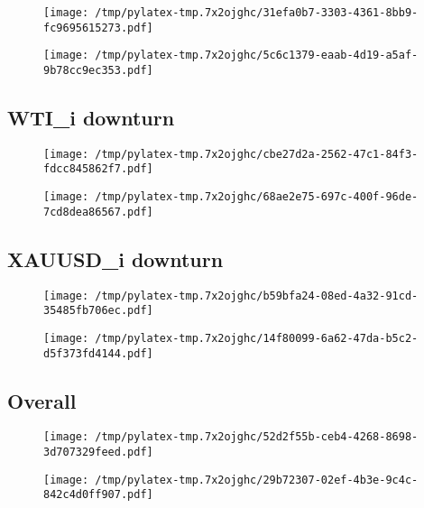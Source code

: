 \documentclass{article}%
\begin{document}
\begin{figure}[htbp]%
\centering%
\texttt{[image: /tmp/pylatex-tmp.7x2ojghc/31efa0b7-3303-4361-8bb9-fc9695615273.pdf]}%
\end{figure}

%


\begin{figure}[htbp]%
\centering%
\texttt{[image: /tmp/pylatex-tmp.7x2ojghc/5c6c1379-eaab-4d19-a5af-9b78cc9ec353.pdf]}%
\end{figure}

%
\newpage %
\subsection{WTI\_i downturn}%
\label{subsec:WTIidownturn}%


\begin{figure}[htbp]%
\centering%
\texttt{[image: /tmp/pylatex-tmp.7x2ojghc/cbe27d2a-2562-47c1-84f3-fdcc845862f7.pdf]}%
\end{figure}

%


\begin{figure}[htbp]%
\centering%
\texttt{[image: /tmp/pylatex-tmp.7x2ojghc/68ae2e75-697c-400f-96de-7cd8dea86567.pdf]}%
\end{figure}

%
\newpage %
\subsection{XAUUSD\_i downturn}%
\label{subsec:XAUUSDidownturn}%


\begin{figure}[htbp]%
\centering%
\texttt{[image: /tmp/pylatex-tmp.7x2ojghc/b59bfa24-08ed-4a32-91cd-35485fb706ec.pdf]}%
\end{figure}

%


\begin{figure}[htbp]%
\centering%
\texttt{[image: /tmp/pylatex-tmp.7x2ojghc/14f80099-6a62-47da-b5c2-d5f373fd4144.pdf]}%
\end{figure}

%
\newpage %
\subsection{Overall}%
\label{subsec:Overall}%


\begin{figure}[htbp]%
\centering%
\texttt{[image: /tmp/pylatex-tmp.7x2ojghc/52d2f55b-ceb4-4268-8698-3d707329feed.pdf]}%
\end{figure}

%


\begin{figure}[htbp]%
\centering%
\texttt{[image: /tmp/pylatex-tmp.7x2ojghc/29b72307-02ef-4b3e-9c4c-842c4d0ff907.pdf]}%
\end{figure}

%
\end{document}

